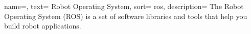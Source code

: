 
{
  name=,
  text= Robot Operating System,
  sort= ros,
  description= {The Robot Operating System (ROS) is a set of software libraries and tools that help you build robot applications.~\cite{site:ros}}
}
